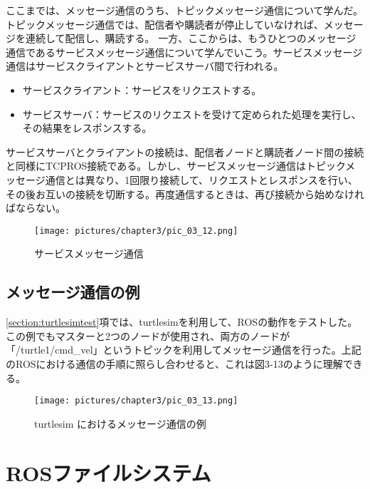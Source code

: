 ここまでは、メッセージ通信のうち、トピックメッセージ通信について学んだ。トピックメッセージ通信では、配信者や購読者が停止していなければ、メッセージを連続して配信し、購読する。
一方、ここからは、もうひとつのメッセージ通信であるサービスメッセージ通信について学んでいこう。サービスメッセージ通信はサービスクライアントとサービスサーバ間で行われる。
\\
\begin{itemize}
\item サービスクライアント：サービスをリクエストする。
\item サービスサーバ：サービスのリクエストを受けて定められた処理を実行し、その結果をレスポンスする。
\end{itemize}
\vspace{\baselineskip}

サービスサーバとクライアントの接続は、配信者ノードと購読者ノード間の接続と同様にTCPROS接続である。しかし、サービスメッセージ通信はトピックメッセージ通信とは異なり、1回限り接続して、リクエストとレスポンスを行い、その後お互いの接続を切断する。再度通信するときは、再び接続から始めなければならない。

\begin{figure}[h]
  \centering
  \texttt{[image: pictures/chapter3/pic\_03\_12.png]}
  \caption{サービスメッセージ通信}
\end{figure}

\subsection{メッセージ通信の例}

\ref{section:turtlesimtest}項では、turtlesimを利用して、ROSの動作をテストした。この例でもマスターと2つのノードが使用され、両方のノードが「/turtle1/cmd\_vel」というトピックを利用してメッセージ通信を行った。上記のROSにおける通信の手順に照らし合わせると、これは図3-13のように理解できる。

\begin{figure}[h]
  \centering
  \texttt{[image: pictures/chapter3/pic\_03\_13.png]}
  \caption{turtlesim におけるメッセージ通信の例}
\end{figure}

\section{ROSファイルシステム}

